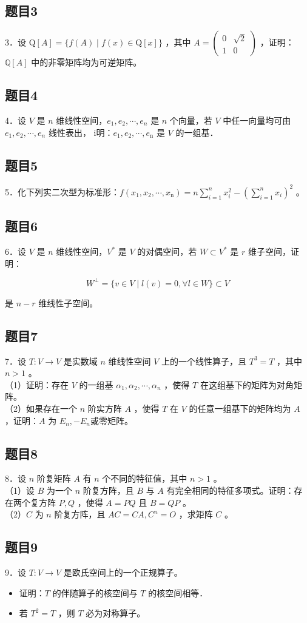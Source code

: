\documentclass{article}
\begin{document}
\subsection{题目3}
3．设 \(\mathrm{Q}[A]=\{f(A) \mid f(x) \in \mathrm{Q}[x]\}\) ，其中 \(A=\left(\begin{array}{ll}0 & \sqrt{2} \\ 1 & 0\end{array}\right)\) ，证明： \(\mathbb{Q}[A]\) 中的非零矩阵均为可逆矩阵。

\subsection{题目4}
4．设 \(V\) 是 \(n\) 维线性空间，\(e_{1}, e_{2}, \cdots, e_{n}\) 是 \(n\) 个向量，若 \(V\) 中任一向量均可由 \(e_{1}, e_{2}, \cdots, e_{n}\) 线性表出， i明：\(e_{1}, e_{2}, \cdots, e_{\mathrm{n}}\) 是 \(V\) 的一组基．

\subsection{题目5}
5．化下列实二次型为标准形：\(f\left(x_{1}, x_{2}, \cdots, x_{\mathrm{n}}\right)=n \sum_{i=1}^{n} x_{i}^{2}-\left(\sum_{i=1}^{n} x_{i}\right)^{2}\) 。

\subsection{题目6}
6．设 \(V\) 是 \(n\) 维线性空间，\(V^{*}\) 是 \(V\) 的对偶空间，若 \(W \subset V^{*}\) 是 \(r\) 维子空间，证明：

\[
W^{\perp}=\{v \in V \mid l(v)=0, \forall l \in W\} \subset V
\]

是 \(n-r\) 维线性子空间。

\subsection{题目7}
7．设 \(T: V \rightarrow V\) 是实数域 \(n\) 维线性空间 \(V\) 上的一个线性算子，且 \(T^{3}=T\) ，其中 \(n>1\) 。\\
（1）证明：存在 \(V\) 的一组基 \(\alpha_{1}, \alpha_{2}, \cdots, \alpha_{n}\) ，使得 \(T\) 在这组基下的矩阵为对角矩阵。\\
（2）如果存在一个 \(n\) 阶实方阵 \(A\) ，使得 \(T\) 在 \(V\) 的任意一组基下的矩阵均为 \(A\) ，证明：\(A\) 为 \(E_{n},-E_{n}\)或零矩阵。

\subsection{题目8}
8．设 \(n\) 阶复矩阵 \(A\) 有 \(n\) 个不同的特征值，其中 \(n>1\) 。\\
（1）设 \(B\) 为一个 \(n\) 阶复方阵，且 \(B\) 与 \(A\) 有完全相同的特征多项式。证明：存在两个复方阵 \(P, Q\) ，使得 \(A=P Q\) 且 \(B=Q P\) 。\\
（2）\(C\) 为 \(n\) 阶复方阵，且 \(A C=C A, C^{n}=O\) ，求矩阵 \(C\) 。

\subsection{题目9}
9．设 \(T: V \rightarrow V\) 是欧氏空间上的一个正规算子。

\begin{itemize}
  \item[（1）] 证明：\(T\) 的伴随算子的核空间与 \(T\) 的核空间相等．
  \item[（2）] 若 \(T^{2}=T\) ，则 \(T\) 必为对称算子。
\end{itemize}
\end{document}
